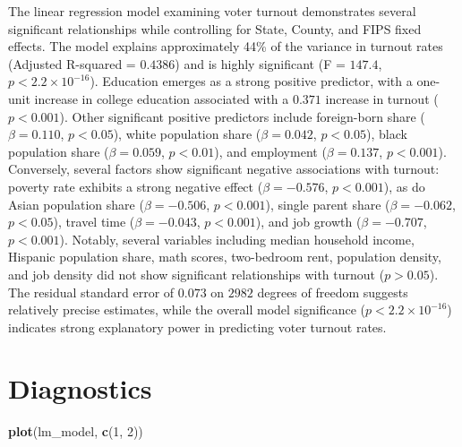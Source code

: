 \documentclass[
]{article}
\newenvironment{Shaded}{\begin{snugshade}}{\end{snugshade}}
\newcommand{\DecValTok}[1]{\textcolor[rgb]{0.00,0.00,0.81}{#1}}
\newcommand{\FunctionTok}[1]{\textcolor[rgb]{0.13,0.29,0.53}{\textbf{#1}}}
\newcommand{\NormalTok}[1]{#1}
\begin{document}
The linear regression model examining voter turnout demonstrates several
significant relationships while controlling for State, County, and FIPS
fixed effects. The model explains approximately 44\% of the variance in
turnout rates (Adjusted R-squared = \(0.4386\)) and is highly
significant (F = \(147.4\), \(p < 2.2 \times 10^{-16}\)). Education
emerges as a strong positive predictor, with a one-unit increase in
college education associated with a \(0.371\) increase in turnout
(\(p < 0.001\)). Other significant positive predictors include
foreign-born share (\(\beta = 0.110\), \(p < 0.05\)), white population
share (\(\beta = 0.042\), \(p < 0.05\)), black population share
(\(\beta = 0.059\), \(p < 0.01\)), and employment (\(\beta = 0.137\),
\(p < 0.001\)). Conversely, several factors show significant negative
associations with turnout: poverty rate exhibits a strong negative
effect (\(\beta = -0.576\), \(p < 0.001\)), as do Asian population share
(\(\beta = -0.506\), \(p < 0.001\)), single parent share
(\(\beta = -0.062\), \(p < 0.05\)), travel time (\(\beta = -0.043\),
\(p < 0.001\)), and job growth (\(\beta = -0.707\), \(p < 0.001\)).
Notably, several variables including median household income, Hispanic
population share, math scores, two-bedroom rent, population density, and
job density did not show significant relationships with turnout
(\(p > 0.05\)). The residual standard error of \(0.073\) on \(2982\)
degrees of freedom suggests relatively precise estimates, while the
overall model significance (\(p < 2.2 \times 10^{-16}\)) indicates
strong explanatory power in predicting voter turnout rates.

\section{Diagnostics}\label{diagnostics}

\begin{Shaded}
\begin{Highlighting}[]
\FunctionTok{plot}\NormalTok{(lm\_model, }\FunctionTok{c}\NormalTok{(}\DecValTok{1}\NormalTok{, }\DecValTok{2}\NormalTok{))}
\end{Highlighting}
\end{Shaded}
\end{document}
